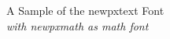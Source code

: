 \documentclass[11pt]{article}
\begin{document}
{\LARGE \noindent A Sample of the newpxtext Font}\\

{\large \noindent \textit{with newpxmath as math font}}\\[5pt]


\end{document}
